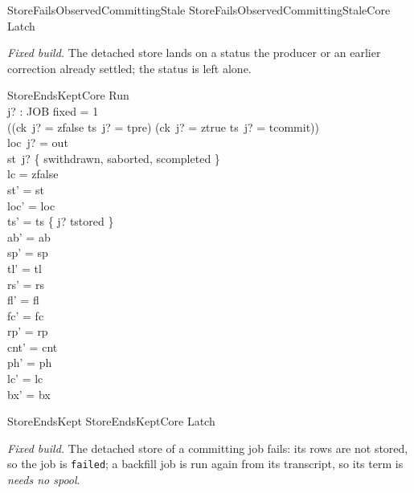 \documentclass[a4paper,10pt,fleqn]{article}
\newcommand{\field}[1]{\texttt{#1}}
\begin{document}
\begin{zed}
StoreFailsObservedCommittingStale  StoreFailsObservedCommittingStaleCore \land Latch
\end{zed}

\emph{Fixed build.} The detached store lands on a status the producer or an
earlier correction already settled; the status is left alone.

\begin{schema}{StoreEndsKeptCore}
\Delta Run \\ j? : JOB
\where
fixed = 1 \\
((ck~j? = zfalse \land ts~j? = tpre) \lor (ck~j? = ztrue \land ts~j? = tcommit)) \\
loc~j? = out \\
st~j? \in \{ swithdrawn, saborted, scompleted \} \\
lc = zfalse \\
st' = st \\
loc' = loc \\
ts' = ts \oplus \{ j? \mapsto tstored \} \\
ab' = ab \\
sp' = sp \\
tl' = tl \\
rs' = rs \\
fl' = fl \\
fc' = fc \\
rp' = rp \\
cnt' = cnt \\
ph' = ph \\
lc' = lc \\
bx' = bx
\end{schema}

\begin{zed}
StoreEndsKept  StoreEndsKeptCore \land Latch
\end{zed}

\emph{Fixed build.} The detached store of a committing job fails: its rows are
not stored, so the job is \field{failed}; a backfill job is run again from its
transcript, so its term is \emph{needs no spool}.
\end{document}
